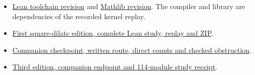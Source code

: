 \documentclass[12pt,letterpaper]{article}
\begin{document}
\begin{itemize}
\item \href{https://github.com/leanprover/lean4/commit/819816b2e0a3bf405af45ae5c7af2491d8f5bee6}{Lean toolchain revision} and \href{https://github.com/leanprover-community/mathlib4/commit/0df444a360eaa60ab8c11dca51a86af692955474}{Mathlib revision}. The compiler and library are dependencies of the recorded kernel replay.
\item \href{https://github.com/nousentllc/riemann-hypothesis/tree/17263859a4d27c62cfc67571737355f61a080806/research/uriel/experiments/ramified-square-dilates}{First square-dilate edition, complete Lean study, replay and ZIP}.
\item \href{https://github.com/nousentllc/riemann-hypothesis/tree/459a04431bbcc912c212b64fcc298b6a07774506/research/uriel/portfolio/ramified-companion}{Companion checkpoint, written route, direct counts and checked obstruction}.
\item \href{https://github.com/nousentllc/riemann-hypothesis/tree/1747b933087347e26863fbcb3dbb82debd0441e0/research/uriel/experiments/ramified-companion-lean}{Third edition, companion endpoint and 114-module study receipt}.
\end{itemize}
\endgroup
\end{document}
